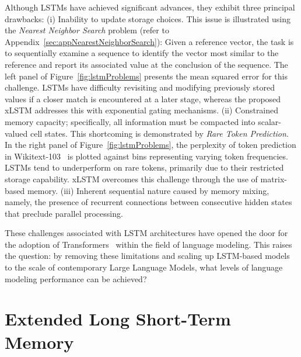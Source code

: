 Although LSTMs have achieved significant advances, they exhibit three principal drawbacks: (i) Inability to update storage choices. This issue is illustrated using the {\it Nearest Neighbor Search} problem (refer to Appendix~\ref{sec:appNearestNeighborSearch}): Given a reference vector, the task is to sequentially examine a sequence to identify the vector most similar to the reference and report its associated value at the conclusion of the sequence. The left panel of Figure~\ref{fig:lstmProblems} presents the mean squared error for this challenge. LSTMs have difficulty revisiting and modifying previously stored values if a closer match is encountered at a later stage, whereas the proposed xLSTM addresses this with exponential gating mechanisms. (ii) Constrained memory capacity; specifically, all information must be compacted into scalar-valued cell states. This shortcoming is demonstrated by {\it Rare Token Prediction}. In the right panel of Figure~\ref{fig:lstmProblems}, the perplexity of token prediction in Wikitext-103~\citep{Merity:17} is plotted against bins representing varying token frequencies. LSTMs tend to underperform on rare tokens, primarily due to their restricted storage capability. xLSTM overcomes this challenge through the use of matrix-based memory. (iii) Inherent sequential nature caused by memory mixing, namely, the presence of recurrent connections between consecutive hidden states that preclude parallel processing. 

These challenges associated with LSTM architectures have opened the door for the adoption of Transformers~\citep{Vaswani:17} within the field of language modeling. This raises the question: by removing these limitations and scaling up LSTM-based models to the scale of contemporary Large Language Models, what levels of language modeling performance can be achieved?

\section{Extended Long Short-Term Memory}
\label{sec:xLSTM}

